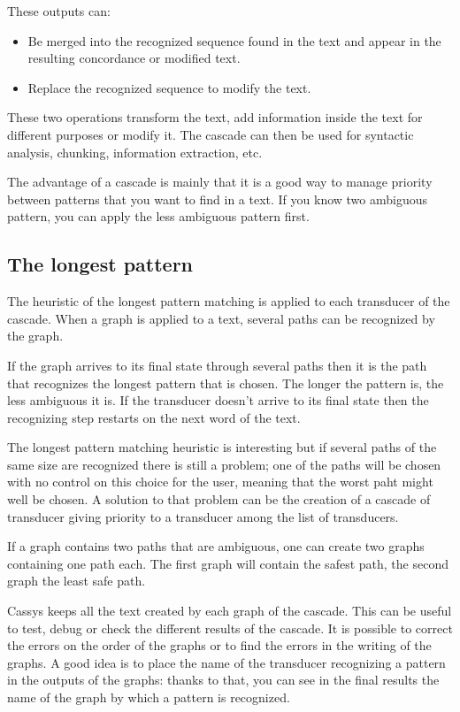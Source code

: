 \bigskip
\noindent These outputs can:
\begin{itemize}
	\item	Be merged into the recognized sequence found in the text and appear in the resulting concordance or modified text. 
	\item	Replace the recognized sequence to modify the text. 
\end{itemize}

\bigskip
\noindent These two operations transform the text, add information inside the text for different purposes or modify it. The cascade can then be used for syntactic analysis, chunking, information extraction, etc. 

\bigskip
\noindent The advantage of a cascade is mainly that it is a good way to manage priority between patterns that you want to find in a text. If you know two ambiguous pattern, you can apply the less ambiguous pattern first.

\subsection{The longest pattern}

The heuristic of the longest pattern matching is applied to each transducer of the cascade. When a graph is applied to a text, several paths can be recognized
by the graph. 

\bigskip
\noindent If the graph arrives to its final state through several paths then it is the path that recognizes the longest pattern that is chosen. The longer
the pattern is, the less ambiguous it is.
If the transducer doesn't arrive to its final state then the recognizing step restarts on the next word of the text.

\bigskip
\noindent The longest pattern matching heuristic is interesting but if several paths of the same size are recognized there is still a problem; one of the paths will be chosen with no control on this choice for the user, meaning that the worst paht might well be chosen. A solution to that problem can be the creation of a cascade of transducer giving priority to a transducer among the list of transducers.

\bigskip
\noindent If a graph contains two paths that are ambiguous, one can create two graphs containing one path each. 
The first graph will contain the safest path, the second graph the least safe path.

\bigskip
\noindent Cassys keeps all the text created by each graph of the cascade. This can be useful to test, debug or check the different results of the cascade. It is possible 
to correct the errors on the order of the graphs or to find the errors in the writing of the graphs. A good idea is to place the name of the transducer recognizing a pattern in the outputs of the graphs: thanks to that, you can see in the final results the name of the graph by which a pattern is recognized. 

